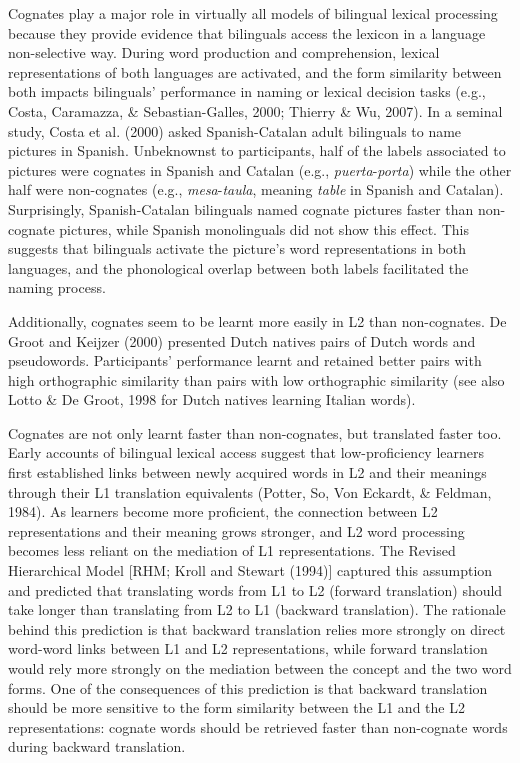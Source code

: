 \documentclass[
  english,
  man,floatsintext]{apa6}
\begin{document}
Cognates play a major role in virtually all models of bilingual lexical processing because they provide evidence that bilinguals access the lexicon in a language non-selective way. During word production and comprehension, lexical representations of both languages are activated, and the form similarity between both impacts bilinguals' performance in naming or lexical decision tasks (e.g., Costa, Caramazza, \& Sebastian-Galles, 2000; Thierry \& Wu, 2007). In a seminal study, Costa et al. (2000) asked Spanish-Catalan adult bilinguals to name pictures in Spanish. Unbeknownst to participants, half of the labels associated to pictures were cognates in Spanish and Catalan (e.g., \emph{puerta}-\emph{porta}) while the other half were non-cognates (e.g., \emph{mesa}-\emph{taula}, meaning \emph{table} in Spanish and Catalan). Surprisingly, Spanish-Catalan bilinguals named cognate pictures faster than non-cognate pictures, while Spanish monolinguals did not show this effect. This suggests that bilinguals activate the picture's word representations in both languages, and the phonological overlap between both labels facilitated the naming process.

Additionally, cognates seem to be learnt more easily in L2 than non-cognates. De Groot and Keijzer (2000) presented Dutch natives pairs of Dutch words and pseudowords. Participants' performance learnt and retained better pairs with high orthographic similarity than pairs with low orthographic similarity (see also Lotto \& De Groot, 1998 for Dutch natives learning Italian words).

Cognates are not only learnt faster than non-cognates, but translated faster too. Early accounts of bilingual lexical access suggest that low-proficiency learners first established links between newly acquired words in L2 and their meanings through their L1 translation equivalents (Potter, So, Von Eckardt, \& Feldman, 1984). As learners become more proficient, the connection between L2 representations and their meaning grows stronger, and L2 word processing becomes less reliant on the mediation of L1 representations. The Revised Hierarchical Model {[}RHM; Kroll and Stewart (1994){]} captured this assumption and predicted that translating words from L1 to L2 (forward translation) should take longer than translating from L2 to L1 (backward translation). The rationale behind this prediction is that backward translation relies more strongly on direct word-word links between L1 and L2 representations, while forward translation would rely more strongly on the mediation between the concept and the two word forms. One of the consequences of this prediction is that backward translation should be more sensitive to the form similarity between the L1 and the L2 representations: cognate words should be retrieved faster than non-cognate words during backward translation.
\end{document}

